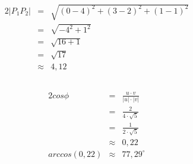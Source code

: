 \documentclass[10pt,a4paper,oneside,ngerman,numbers=noenddot]{scrartcl}
\begin{document}
\subsection{} %
\begin{alignat*}{2}
|P_{1}P_{2}| &=& \sqrt{(0-4)^{2} + (3-2)^{2} + (1-1)^{2}} \\
&=& \sqrt{-4^{2} + {1}^{2}} \\
&=& \sqrt{16 + 1} \\
&=& \sqrt{17} \\
&\approx & 4,12
\end{alignat*}
\subsection{} %
\begin{alignat*}{2}
cos \phi &=& \frac{u \cdot v}{|u| \cdot |v|} \\
&=& \frac{2}{4 \cdot \sqrt{5}} \\
&=& \frac{1}{2 \cdot \sqrt{5}} \\
&\approx & 0,22 \\
arccos(0,22) &\approx &  77,29^{\circ}
\end{alignat*}
\section{} %
\end{document}
